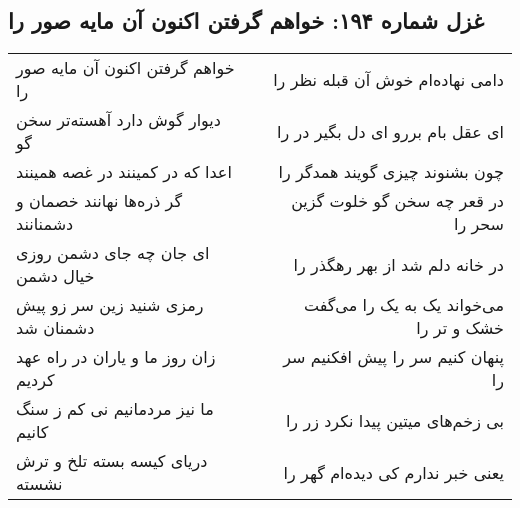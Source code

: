 \begin{center}
\section*{غزل شماره ۱۹۴: خواهم گرفتن اکنون آن مایه صور را}
\label{sec:0194}
\begin{longtable}{l p{0.5cm} r}
خواهم گرفتن اکنون آن مایه صور را
&&
دامی نهاده‌ام خوش آن قبله نظر را
\\
دیوار گوش دارد آهسته‌تر سخن گو
&&
ای عقل بام بررو ای دل بگیر در را
\\
اعدا که در کمینند در غصه همینند
&&
چون بشنوند چیزی گویند همدگر را
\\
گر ذره‌ها نهانند خصمان و دشمنانند
&&
در قعر چه سخن گو خلوت گزین سحر را
\\
ای جان چه جای دشمن روزی خیال دشمن
&&
در خانه دلم شد از بهر رهگذر را
\\
رمزی شنید زین سر زو پیش دشمنان شد
&&
می‌خواند یک به یک را می‌گفت خشک و تر را
\\
زان روز ما و یاران در راه عهد کردیم
&&
پنهان کنیم سر را پیش افکنیم سر را
\\
ما نیز مردمانیم نی کم ز سنگ کانیم
&&
بی زخم‌های میتین پیدا نکرد زر را
\\
دریای کیسه بسته تلخ و ترش نشسته
&&
یعنی خبر ندارم کی دیده‌ام گهر را
\\
\end{longtable}
\end{center}
